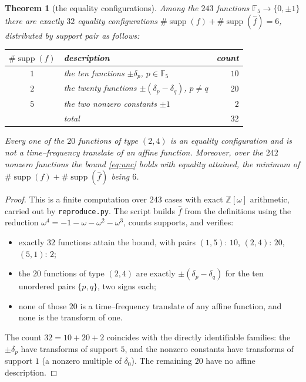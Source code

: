 \documentclass[11pt]{article}
\newtheorem{theorem}{Theorem}
\theoremstyle{definition}
\theoremstyle{remark}
\newcommand{\F}{\mathbb{F}}
\newcommand{\Z}{\mathbb{Z}}
\newcommand{\supp}{\operatorname{supp}}
\newcommand{\fh}{\widehat{f}}
\begin{document}
\begin{theorem}[the equality configurations]\label{thm:enum}
Among the $243$ functions $\F_5\to\{0,\pm1\}$ there are exactly $32$ equality
configurations $\#\supp(f)+\#\supp(\fh)=6$, distributed by support pair as
follows:
\begin{center}
\begin{tabular}{c|l|r}
$\#\supp(f)$ & description & count \\ \hline
$1$ & the ten functions $\pm\delta_p$, $p\in\F_5$ & $10$ \\
$2$ & the twenty functions $\pm(\delta_p-\delta_q)$, $p\ne q$ & $20$ \\
$5$ & the two nonzero constants $\pm1$ & $2$ \\ \hline
& total & $32$
\end{tabular}
\end{center}
Every one of the $20$ functions of type $(2,4)$ is an equality configuration
and is not a time--frequency translate of an affine function. Moreover, over
the $242$ nonzero functions the bound \eqref{eq:unc} holds with equality
attained, the minimum of $\#\supp(f)+\#\supp(\fh)$ being $6$.
\end{theorem}

\begin{proof}
This is a finite computation over $243$ cases with exact $\Z[\omega]$
arithmetic, carried out by \texttt{reproduce.py}. The script builds $\fh$ from
the definitions using the reduction $\omega^4=-1-\omega-\omega^2-\omega^3$,
counts supports, and verifies:
\begin{itemize}
\item exactly $32$ functions attain the bound, with pairs
$(1,5)$: $10$, $(2,4)$: $20$, $(5,1)$: $2$;
\item the $20$ functions of type $(2,4)$ are exactly
$\pm(\delta_p-\delta_q)$ for the ten unordered pairs $\{p,q\}$, two signs each;
\item none of those $20$ is a time--frequency translate of any affine
function, and none is the transform of one.
\end{itemize}
The count $32=10+20+2$ coincides with the directly identifiable families: the
$\pm\delta_p$ have transforms of support $5$, and the nonzero constants have
transforms of support $1$ (a nonzero multiple of $\delta_0$). The remaining
$20$ have no affine description.
\end{proof}
\end{document}
